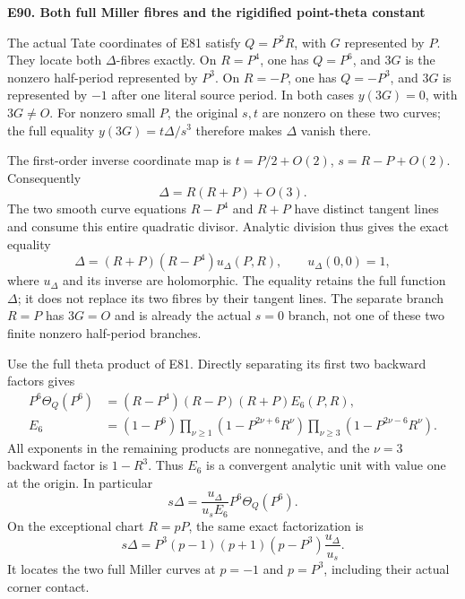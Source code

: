 \medskip\noindent\textbf{E90. Both full Miller fibres and the rigidified point-theta constant}

\par\nobreak

The actual Tate coordinates of E81 satisfy \(Q=P^2R\),
with \(G\) represented by \(P\). They locate both
\(\Delta\)-fibres exactly. On \(R=P^4\), one has
\(Q=P^6\), and \(3G\) is the nonzero half-period
represented by \(P^3\). On \(R=-P\), one has
\(Q=-P^3\), and \(3G\) is represented by \(-1\) after one literal source period. In both cases
\(y(3G)=0\), with \(3G\ne O\). For nonzero small
\(P\), the original \(s,t\) are nonzero on these
two curves; the full equality
\(y(3G)=t\Delta/s^3\) therefore makes \(\Delta\)
vanish there.

The first-order inverse coordinate map is
\(t=P/2+O(2)\), \(s=R-P+O(2)\). Consequently
\[
 \Delta=R(R+P)+O(3).
\]
The two smooth curve equations \(R-P^4\) and
\(R+P\) have distinct tangent lines and consume this
entire quadratic divisor. Analytic division thus gives
the exact equality
\[
 \Delta=(R+P)(R-P^4)u_\Delta(P,R),\qquad
 u_\Delta(0,0)=1,
 \tag{E90.1}
\]
where \(u_\Delta\) and its inverse are holomorphic.
The equality retains the full function \(\Delta\);
it does not replace its two fibres by their tangent
lines. The separate branch \(R=P\) has \(3G=O\) and is already the actual \(s=0\) branch, not one
of these two finite nonzero half-period branches.

Use the full theta product of E81. Directly separating
its first two backward factors gives
\[
\begin{aligned}
 P^6\Theta_Q(P^6)
   &=(R-P^4)(R-P)(R+P)E_6(P,R),\\
 E_6&=(1-P^6)
       \prod_{\nu\ge1}(1-P^{2\nu+6}R^\nu)
       \prod_{\nu\ge3}(1-P^{2\nu-6}R^\nu).
\end{aligned}                                                 \tag{E90.2}
\]
All exponents in the remaining products are nonnegative,
and the \(\nu=3\) backward factor is \(1-R^3\).
Thus \(E_6\) is a convergent analytic unit with value
one at the origin. In particular
\[
 s\Delta=\frac{u_\Delta}{u_sE_6}
                    P^6\Theta_Q(P^6).
 \tag{E90.3}
\]
On the exceptional chart \(R=pP\), the same exact
factorization is
\[
 s\Delta=P^3(p-1)(p+1)(p-P^3)\frac{u_\Delta}{u_s}.
 \tag{E90.4}
\]
It locates the two full Miller curves at \(p=-1\) and \(p=P^3\), including their actual corner contact.

